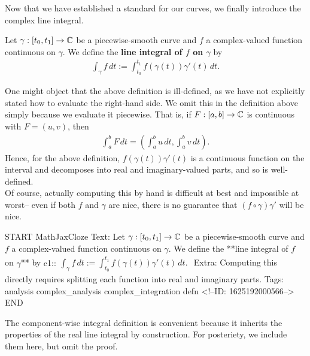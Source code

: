 \documentclass{memoir}
\begin{document}
Now that we have established a standard for our curves, we finally introduce the complex line integral.

\begin{defn}
	Let \(\gamma :[t_0,t_1]\to \mathbb{C}\) be a piecewise-smooth curve and \(f\) a complex-valued function continuous on \(\gamma \). We define the \textbf{line integral of \(f\) on \(\gamma \)} by
	\begin{align*}
		\int_\gamma f \,d t := \int_{t_0}^{t_1} f(\gamma (t)) \gamma'(t)\,d t .
	\end{align*}
\end{defn}
One might object that the above definition is ill-defined, as we have not explicitly stated how to evaluate the right-hand side. We omit this in the definition above simply because we evaluate it piecewise. That is, if \(F:[a,b]\to \mathbb{C}\) is continuous with \(F = (u,v)\), then
\begin{align*}
	\int_{a}^{b} F \,d t = \left( \int_{a}^{b} u \,d t, \int_{a}^{b} v \,d t \right)  .
\end{align*}
Hence, for the above definition, \(f(\gamma (t))\gamma'(t)\) is a continuous function on the interval and decomposes into real and imaginary-valued parts, and so is well-defined.\\

Of course, actually computing this by hand is difficult at best and impossible at worst-- even if both \(f\) and \(\gamma \) are nice, there is no guarantee that \((f\circ \gamma )\gamma'\) will be nice.\\

\begin{anki}
START
MathJaxCloze
Text: Let \(\gamma :[t_0,t_1]\to \mathbb{C}\) be a piecewise-smooth curve and \(f\) a complex-valued function continuous on \(\gamma \). We define the **line integral of \(f\) on \(\gamma \)** by
 {{c1::\(\begin{align*}
         	\int_\gamma f \,d t := \int_{t_0}^{t_1} f(\gamma (t)) \gamma'(t)\,d t .
         \end{align*}\)}}
Extra: Computing this directly requires splitting each function into real and imaginary parts.
Tags: analysis complex_analysis complex_integration defn
<!--ID: 1625192000566-->
END
\end{anki}

The component-wise integral definition is convenient because it inherits the properties of the real line integral by construction. For posteriety, we include them here, but omit the proof.
\end{document}
